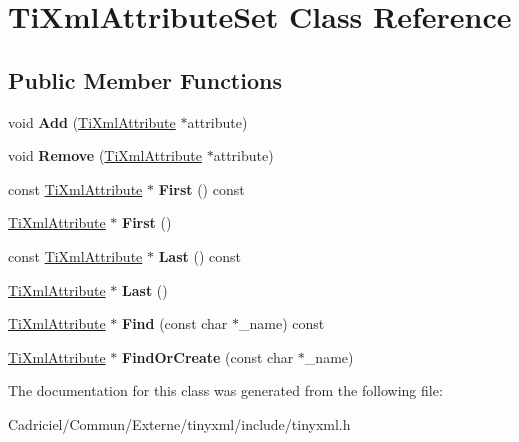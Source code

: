 \hypertarget{class_ti_xml_attribute_set}{\section{Ti\-Xml\-Attribute\-Set Class Reference}
\label{class_ti_xml_attribute_set}
}
\subsection*{Public Member Functions}
\begin{DoxyCompactItemize}
\item 
\hypertarget{class_ti_xml_attribute_set_a745e50ddaae3bee93e4589321e0b9c1a}{void {\bfseries Add} (\hyperlink{class_ti_xml_attribute}{Ti\-Xml\-Attribute} $\ast$attribute)}\label{class_ti_xml_attribute_set_a745e50ddaae3bee93e4589321e0b9c1a}

\item 
\hypertarget{class_ti_xml_attribute_set_a924a73d071f2573f9060f0be57879c57}{void {\bfseries Remove} (\hyperlink{class_ti_xml_attribute}{Ti\-Xml\-Attribute} $\ast$attribute)}\label{class_ti_xml_attribute_set_a924a73d071f2573f9060f0be57879c57}

\item 
\hypertarget{class_ti_xml_attribute_set_ae0636e88cedd4b09d61c451860f68598}{const \hyperlink{class_ti_xml_attribute}{Ti\-Xml\-Attribute} $\ast$ {\bfseries First} () const }\label{class_ti_xml_attribute_set_ae0636e88cedd4b09d61c451860f68598}

\item 
\hypertarget{class_ti_xml_attribute_set_a99703bb08ca2aece2d7ef835de339ba0}{\hyperlink{class_ti_xml_attribute}{Ti\-Xml\-Attribute} $\ast$ {\bfseries First} ()}\label{class_ti_xml_attribute_set_a99703bb08ca2aece2d7ef835de339ba0}

\item 
\hypertarget{class_ti_xml_attribute_set_a7b3f3ccf39a97bc25539d3fcc540296a}{const \hyperlink{class_ti_xml_attribute}{Ti\-Xml\-Attribute} $\ast$ {\bfseries Last} () const }\label{class_ti_xml_attribute_set_a7b3f3ccf39a97bc25539d3fcc540296a}

\item 
\hypertarget{class_ti_xml_attribute_set_ab4c4edfb2d74f6ea31aae096743bd6e0}{\hyperlink{class_ti_xml_attribute}{Ti\-Xml\-Attribute} $\ast$ {\bfseries Last} ()}\label{class_ti_xml_attribute_set_ab4c4edfb2d74f6ea31aae096743bd6e0}

\item 
\hypertarget{class_ti_xml_attribute_set_a941aca775190f097b7eefb9e9f078a83}{\hyperlink{class_ti_xml_attribute}{Ti\-Xml\-Attribute} $\ast$ {\bfseries Find} (const char $\ast$\-\_\-name) const }\label{class_ti_xml_attribute_set_a941aca775190f097b7eefb9e9f078a83}

\item 
\hypertarget{class_ti_xml_attribute_set_adb975daec84e6d8a5ff93a85381e6e26}{\hyperlink{class_ti_xml_attribute}{Ti\-Xml\-Attribute} $\ast$ {\bfseries Find\-Or\-Create} (const char $\ast$\-\_\-name)}\label{class_ti_xml_attribute_set_adb975daec84e6d8a5ff93a85381e6e26}

\end{DoxyCompactItemize}


The documentation for this class was generated from the following file\-:\begin{DoxyCompactItemize}
\item 
Cadriciel/\-Commun/\-Externe/tinyxml/include/tinyxml.\-h\end{DoxyCompactItemize}
